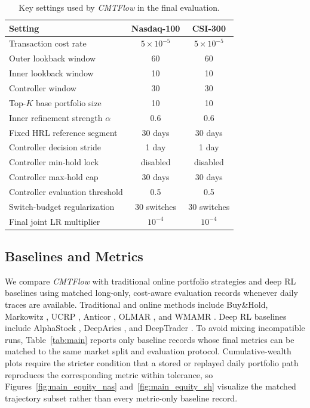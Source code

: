 \documentclass[letterpaper]{article} %
\begin{document}
\begin{table}[t]
\centering
\caption{Key settings used by \textit{CMTFlow} in the final evaluation.}
\label{tab:hyperparam}
\small
\setlength{\tabcolsep}{6pt}
\begin{tabular}{lcc}
\toprule
\textbf{Setting} & \textbf{Nasdaq-100} & \textbf{CSI-300} \\
\midrule
Transaction cost rate & \(5\times10^{-5}\) & \(5\times10^{-5}\) \\
Outer lookback window & 60 & 60 \\
Inner lookback window & 10 & 10 \\
Controller window & 30 & 30 \\
Top-\(K\) base portfolio size & 10 & 10 \\
Inner refinement strength \(\alpha\) & 0.6 & 0.6 \\
Fixed HRL reference segment & 30 days & 30 days \\
Controller decision stride & 1 day & 1 day \\
Controller min-hold lock & disabled & disabled \\
Controller max-hold cap & 30 days & 30 days \\
Controller evaluation threshold & 0.5 & 0.5 \\
Switch-budget regularization & 30 switches & 30 switches \\
Final joint LR multiplier & \(10^{-4}\) & \(10^{-4}\) \\
\bottomrule
\end{tabular}
\end{table}

\subsection{Baselines and Metrics}

We compare \textit{CMTFlow} with traditional online portfolio strategies and deep RL baselines using matched long-only, cost-aware evaluation records whenever daily traces are available. Traditional and online methods include Buy\&Hold, Markowitz \citep{MVO}, UCRP \citep{UCRP}, Anticor \citep{ANTICOR}, OLMAR \citep{OLMAR}, and WMAMR \citep{WMAMR}. Deep RL baselines include AlphaStock \citep{alphastock}, DeepAries \citep{deeparies2025}, and DeepTrader \citep{6}. To avoid mixing incompatible runs, Table~\ref{tab:main} reports only baseline records whose final metrics can be matched to the same market split and evaluation protocol. Cumulative-wealth plots require the stricter condition that a stored or replayed daily portfolio path reproduces the corresponding metric within tolerance, so Figures~\ref{fig:main_equity_nas} and~\ref{fig:main_equity_sh} visualize the matched trajectory subset rather than every metric-only baseline record.
\end{document}
